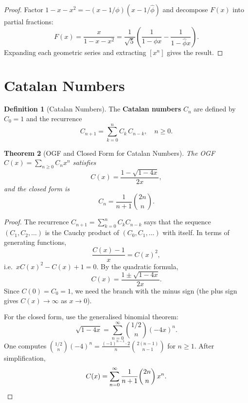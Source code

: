 \documentclass[12pt,a4paper,openany]{book}
\theoremstyle{definition}
\newtheorem{definition}{Definition}[chapter]
\theoremstyle{plain}
\newtheorem{theorem}[definition]{Theorem}
\theoremstyle{remark}
\begin{document}
\begin{proof}
Factor $1 - x - x^2 = -(x - 1/\phi)(x - 1/\hat\phi)$ and decompose
$F(x)$ into partial fractions:
\[
  F(x) = \frac{x}{1-x-x^2}
  = \frac{1}{\sqrt{5}}\left(\frac{1}{1-\phi x} - \frac{1}{1-\hat\phi x}\right).
\]
Expanding each geometric series and extracting $[x^n]$ gives the result.
\end{proof}



\section{Catalan Numbers}\label{sec:catalan}

\begin{definition}[Catalan Numbers]\label{def:catalan}
The \textbf{Catalan numbers} $C_n$ are
defined by $C_0 = 1$ and the recurrence
\[
  C_{n+1} = \sum_{k=0}^{n} C_k\,C_{n-k}, \quad n \ge 0.
\]
\end{definition}

\begin{theorem}[OGF and Closed Form for Catalan Numbers]\label{thm:catalan-ogf}
The OGF $C(x) = \sum_{n\ge 0}C_n x^n$ satisfies
\[
  C(x) = \frac{1 - \sqrt{1-4x}}{2x},
\]
and the closed form is
\[
  C_n = \frac{1}{n+1}\binom{2n}{n}.
\]
\end{theorem}

\begin{proof}
The recurrence $C_{n+1} = \sum_{k=0}^n C_k C_{n-k}$ says that the
sequence $(C_1, C_2, \dots)$ is the Cauchy product of $(C_0, C_1,
\dots)$ with itself.  In terms of generating functions,
\[
  \frac{C(x) - 1}{x} = C(x)^2,
\]
i.e.\ $xC(x)^2 - C(x) + 1 = 0$.  By the quadratic formula,
\[
  C(x) = \frac{1 \pm \sqrt{1 - 4x}}{2x}.
\]
Since $C(0) = C_0 = 1$, we need the branch with the minus sign (the
plus sign gives $C(x) \to \infty$ as $x \to 0$).

For the closed form, use the generalised binomial theorem:
\[
  \sqrt{1-4x} = \sum_{n=0}^{\infty}\binom{1/2}{n}(-4x)^n.
\]
One computes
$\binom{1/2}{n}(-4)^n = \frac{(-1)^{n-1}\cdot 2}{n}\binom{2(n-1)}{n-1}$
for $n \ge 1$.  After simplification,
\[
  C(x) = \sum_{n=0}^{\infty}\frac{1}{n+1}\binom{2n}{n}\,x^n. \qedhere
\]
\end{proof}
\end{document}

